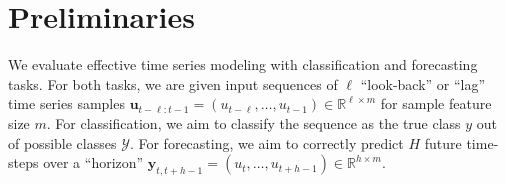 \section{Preliminaries}
%

 We evaluate effective time series modeling with
classification and forecasting tasks. For both tasks, we are given input sequences of $\ell$ ``look-back'' or ``lag'' time series samples $\boldsymbol{u}_{t - \ell: t - 1} = (u_{t - \ell}, \ldots, u_{t - 1}) \in \mathbb{R}^{\ell \times m}$ for sample feature size $m$. 
%
For classification, we aim to classify the sequence as the true class $y$ out of  possible classes $\mathcal{Y}$. 
For forecasting, we aim to correctly predict $H$ future time-steps over a ``horizon'' $\boldsymbol{y}_{t, t + h - 1} = (u_{t}, \ldots, u_{t + h - 1}) \in \mathbb{R}^{h \times m}$.

